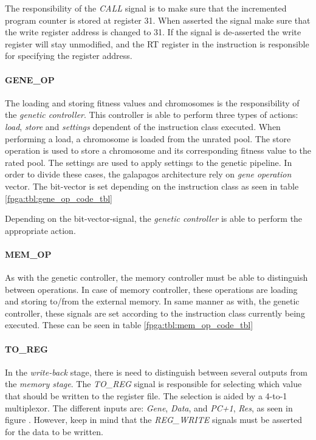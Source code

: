 The responsibility of the \emph{CALL} signal is to make sure that the incremented program counter is stored at register 31. When asserted the signal make sure that the write register address is changed to 31. If the signal is de-asserted the write register will stay unmodified, and the RT register in the instruction is responsible for specifying the register address.


\paragraph{GENE\_OP}
The loading and storing fitness values and chromosomes is the responsibility of the \emph{genetic controller}. This controller is able to perform three types of actions: \emph{load}, \emph{store} and \emph{settings} dependent of the instruction class executed. When performing a load, a chromosome is loaded from the unrated pool. The store operation is used to store a chromosome and its corresponding fitness value to the rated pool. The settings are used to apply settings to the genetic pipeline.  In order to divide these cases, the galapagos architecture rely on \emph{gene operation} vector. The bit-vector is set depending on the instruction class as seen in table \ref{fpga:tbl:gene_op_code_tbl}





Depending on the bit-vector-signal, the \emph{genetic controller} is able to perform the appropriate action. 


\paragraph{MEM\_OP}
As with the genetic controller, the memory controller must be able to distinguish between operations. In case of memory controller, these operations are loading and storing to/from the external memory. In same manner as with, the genetic controller, these signals are set according to the instruction class currently being executed. These can be seen in table \ref{fpga:tbl:mem_op_code_tbl}




\paragraph{TO\_REG}
In the \emph{write-back} stage, there is need to distinguish between several outputs from the \emph{memory stage}. The \emph{TO\_REG} signal is responsible for selecting which value that should be written to the register file. The selection is aided by a 4-to-1 multiplexor. The different inputs are: \emph{Gene}, \emph{Data}, and \emph{PC+1}, \emph{Res}, as seen in figure . However, keep in mind that the \emph{REG\_WRITE} signals must be asserted for the data to be written. 

